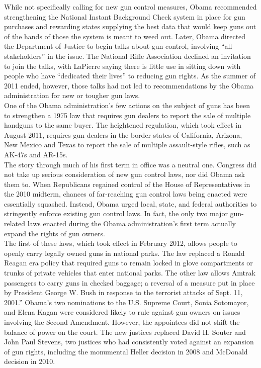 \begin{tcolorbox}[width=\linewidth,title={Example of a Retrieved Document}]
While not specifically calling for new gun control measures, Obama recommended strengthening the National Instant Background Check system in place for gun purchases and rewarding states supplying the best data that would keep guns out of the hands of those the system is meant to weed out. Later, Obama directed the Department of Justice to begin talks about gun control, involving ``all stakeholders” in the issue. The National Rifle Association declined an invitation to join the talks, with LaPierre saying there is little use in sitting down with people who have ``dedicated their lives” to reducing gun rights. As the summer of 2011 ended, however, those talks had not led to recommendations by the Obama administration for new or tougher gun laws.\\
One of the Obama administration’s few actions on the subject of guns has been to strengthen a 1975 law that requires gun dealers to report the sale of multiple handguns to the same buyer. The heightened regulation, which took effect in August 2011, requires gun dealers in the border states of California, Arizona, New Mexico and Texas to report the sale of multiple assault-style rifles, such as AK-47s and AR-15s.\\
The story through much of his first term in office was a neutral one. Congress did not take up serious consideration of new gun control laws, nor did Obama ask them to. When Republicans regained control of the House of Representatives in the 2010 midterm, chances of far-reaching gun control laws being enacted were essentially squashed. Instead, Obama urged local, state, and federal authorities to stringently enforce existing gun control laws. In fact, the only two major gun-related laws enacted during the Obama administration’s first term actually expand the rights of gun owners.\\
The first of these laws, which took effect in February 2012, allows people to openly carry legally owned guns in national parks. The law replaced a Ronald Reagan era policy that required guns to remain locked in glove compartments or trunks of private vehicles that enter national parks. The other law allows Amtrak passengers to carry guns in checked baggage; a reversal of a measure put in place by President George W. Bush in response to the terrorist attacks of Sept. 11, 2001.''
Obama’s two nominations to the U.S. Supreme Court, Sonia Sotomayor, and Elena Kagan were considered likely to rule against gun owners on issues involving the Second Amendment. However, the appointees did not shift the balance of power on the court. The new justices replaced David H. Souter and John Paul Stevens, two justices who had consistently voted against an expansion of gun rights, including the monumental Heller decision in 2008 and McDonald decision in 2010.\\

\end{tcolorbox}
